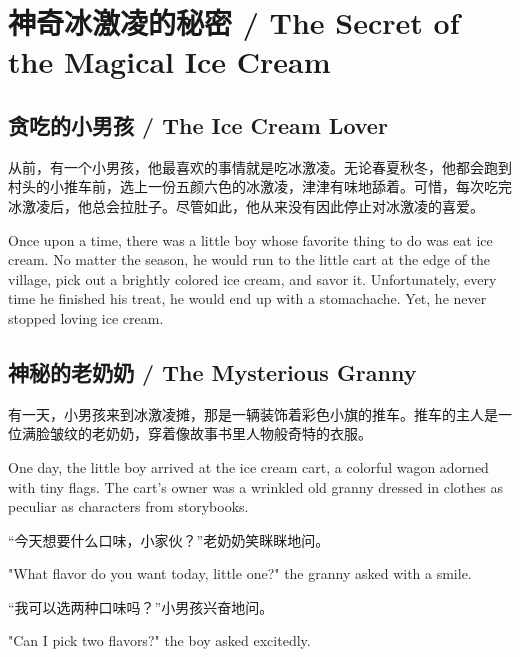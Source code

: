 \chapter*{神奇冰激凌的秘密 / The Secret of the Magical Ice Cream}

\section*{贪吃的小男孩 / The Ice Cream Lover}

从前，有一个小男孩，他最喜欢的事情就是吃冰激凌。无论春夏秋冬，他都会跑到村头的小推车前，选上一份五颜六色的冰激凌，津津有味地舔着。可惜，每次吃完冰激凌后，他总会拉肚子。尽管如此，他从来没有因此停止对冰激凌的喜爱。

\begin{flushright}
Once upon a time, there was a little boy whose favorite thing to do was eat ice cream. No matter the season, he would run to the little cart at the edge of the village, pick out a brightly colored ice cream, and savor it. Unfortunately, every time he finished his treat, he would end up with a stomachache. Yet, he never stopped loving ice cream.
\end{flushright}

\section*{神秘的老奶奶 / The Mysterious Granny}

有一天，小男孩来到冰激凌摊，那是一辆装饰着彩色小旗的推车。推车的主人是一位满脸皱纹的老奶奶，穿着像故事书里人物般奇特的衣服。

\begin{flushright}
One day, the little boy arrived at the ice cream cart, a colorful wagon adorned with tiny flags. The cart’s owner was a wrinkled old granny dressed in clothes as peculiar as characters from storybooks.
\end{flushright}

“今天想要什么口味，小家伙？”老奶奶笑眯眯地问。

\begin{flushright}
"What flavor do you want today, little one?" the granny asked with a smile.
\end{flushright}

“我可以选两种口味吗？”小男孩兴奋地问。

\begin{flushright}
"Can I pick two flavors?" the boy asked excitedly.
\end{flushright}

